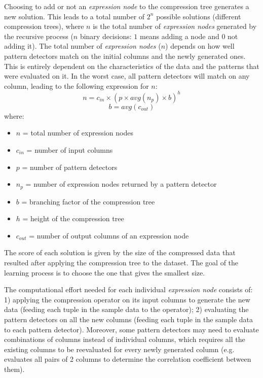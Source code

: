 Choosing to add or not an \textit{expression node} to the compression tree generates a new solution. This leads to a total number of \(2^n\) possible solutions (different compression trees), where \(n\) is the total number of \textit{expression nodes} generated by the recursive process (\(n\) binary decisions: \(1\) means adding a node and \(0\) not adding it). The total number of \textit{expression nodes} (\(n\)) depends on how well pattern detectors match on the initial columns and the newly generated ones. This is entirely dependent on the characteristics of the data and the patterns that were evaluated on it. In the worst case, all pattern detectors will match on any column, leading to the following expression for \(n\):
\begin{equation}
\label{eq:optimizationproblem:n}
    n = c_{in} \times (p \times \mathit{avg}(n_{p}) \times b) ^ h
\end{equation}
\begin{equation}
\label{eq:optimizationproblem:b}
    b = \mathit{avg}(c_{out})
\end{equation}
where:
\begin{itemize}
    \item[] \(n\) = total number of expression nodes
    \item[] \(c_{in}\) = number of input columns
    \item[] \(p\) = number of pattern detectors
    \item[] \(n_{p}\) = number of expression nodes returned by a pattern detector
    \item[] \(b\) = branching factor of the compression tree
    \item[] \(h\) = height of the compression tree
    \item[] \(c_{out}\) = number of output columns of an expression node
\end{itemize}

The score of each solution is given by the size of the compressed data that resulted after applying the compression tree to the dataset. The goal of the learning process is to choose the one that gives the smallest size.

The computational effort needed for each individual \textit{expression node} consists of: 1) applying the compression operator on its input columns to generate the new data (feeding each tuple in the sample data to the operator); 2) evaluating the pattern detectors on all the new columns (feeding each tuple in the sample data to each pattern detector). Moreover, some pattern detectors may need to evaluate combinations of columns instead of individual columns, which requires all the existing columns to be reevaluated for every newly generated column (e.g.  evaluates all pairs of 2 columns to determine the correlation coefficient between them).

\iffalse
TODO:
better formalize problem
https://en.wikipedia.org/wiki/Optimization\_problem
\fi

